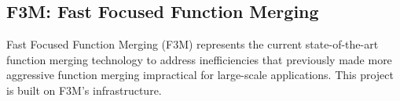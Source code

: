 





\subsection{F3M: Fast Focused Function Merging} \label{F3M}
Fast Focused Function Merging (F3M) represents the current state-of-the-art function merging technology to address inefficiencies that previously made more aggressive function merging impractical for large-scale applications. This project is built on F3M's infrastructure. 

